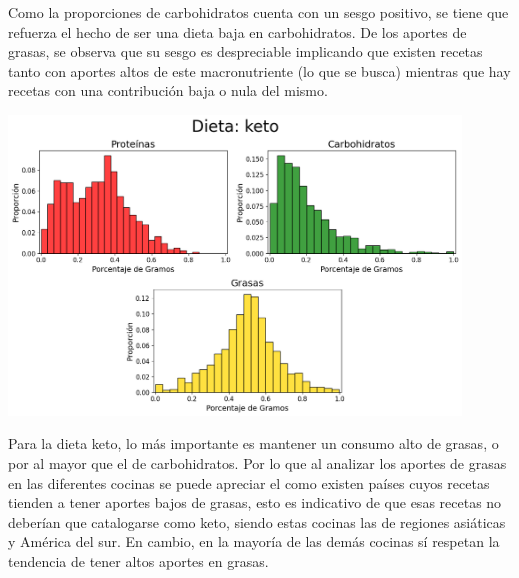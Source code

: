 \documentclass[12pt,a4paper]{article}
\begin{document}
            Como la proporciones de carbohidratos cuenta con un sesgo positivo, se 
            tiene que refuerza el hecho de ser una dieta baja en carbohidratos. 
            De los aportes de grasas, se observa que su sesgo es despreciable implicando 
            que existen recetas tanto con aportes altos de este macronutriente (lo que se 
            busca) mientras que hay recetas con una contribución baja o nula del mismo.
            
            \begin{center}
                \includegraphics[width=0.90\textwidth]{Resources/2_03_plot_02.png}
            \end{center}

            Para la dieta keto, lo más importante es mantener un consumo alto de grasas, o 
            por al mayor que el de carbohidratos. Por lo que al analizar los aportes de grasas 
            en las diferentes cocinas se puede apreciar el como existen países cuyos recetas 
            tienden a tener aportes bajos de grasas, esto es indicativo de que esas recetas no 
            deberían que catalogarse como keto, siendo estas cocinas las de regiones asiáticas
            y América del sur. En cambio, en la mayoría de las demás cocinas sí respetan la 
            tendencia de tener altos aportes en grasas.
\end{document}
